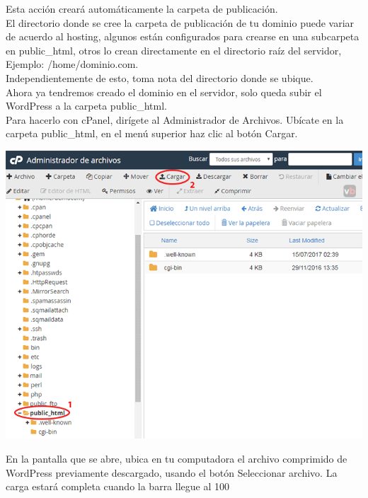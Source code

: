 \begin{enumerate}
		Esta acción creará automáticamente la carpeta de publicación.\\
		
		El directorio donde se cree la carpeta de publicación de tu dominio puede variar de acuerdo al hosting, algunos están configurados para crearse en una subcarpeta en public\_html, otros lo crean directamente en el directorio raíz del servidor, Ejemplo: /home/dominio.com.\\
		
		Independientemente de esto, toma nota del directorio donde se ubique.\\
		
		Ahora ya tendremos creado el dominio en el servidor, solo queda subir el WordPress a la carpeta public\_html.\\
		
		Para hacerlo con cPanel, dirígete al Administrador de Archivos. Ubícate en la carpeta public\_html, en el menú superior haz clic al botón Cargar.
		
		\begin{center}
			\includegraphics[scale=0.4]{image/migra14.png}
		\end{center}
		
		\newpage
		
		En la pantalla que se abre, ubica en tu computadora el archivo comprimido de WordPress previamente descargado, usando el botón Seleccionar archivo. La carga estará completa cuando la barra llegue al 100%
		

\end{enumerate}
